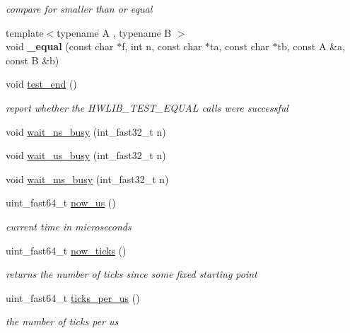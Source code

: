 \begin{DoxyCompactItemize}
\begin{DoxyCompactList}\small\item\em compare for smaller than or equal \end{DoxyCompactList}\item 
\mbox{\label{namespacehwlib_a967170cbb46d2043a348573f9f6d1459}} 
{\footnotesize template$<$typename A , typename B $>$ }\\void {\bfseries \+\_\+equal} (const char $\ast$f, int n, const char $\ast$ta, const char $\ast$tb, const A \&a, const B \&b)
\item 
void \hyperlink{namespacehwlib_af30c15244b6a508f320f01317dc84d7f}{test\+\_\+end} ()
\begin{DoxyCompactList}\small\item\em report whether the H\+W\+L\+I\+B\+\_\+\+T\+E\+S\+T\+\_\+\+E\+Q\+U\+AL calls were successful \end{DoxyCompactList}\item 
void \hyperlink{namespacehwlib_a7f8f4b0176df290091ac1d2cbaede23b}{wait\+\_\+ns\+\_\+busy} (int\+\_\+fast32\+\_\+t n)
\item 
void \hyperlink{namespacehwlib_a9ebdd2f578adeea0543e9c99778e2459}{wait\+\_\+us\+\_\+busy} (int\+\_\+fast32\+\_\+t n)
\item 
void \hyperlink{namespacehwlib_a15a3f36ce8b3f31473cdd8026b7e5960}{wait\+\_\+ms\+\_\+busy} (int\+\_\+fast32\+\_\+t n)
\item 
uint\+\_\+fast64\+\_\+t \hyperlink{namespacehwlib_a27573ff04679de98f9325a8d9cff7a14}{now\+\_\+us} ()
\begin{DoxyCompactList}\small\item\em current time in microseconds \end{DoxyCompactList}\item 
uint\+\_\+fast64\+\_\+t \hyperlink{namespacehwlib_a004512830e68d72d8fd0e3153895e65b}{now\+\_\+ticks} ()
\begin{DoxyCompactList}\small\item\em returns the number of ticks since some fixed starting point \end{DoxyCompactList}\item 
uint\+\_\+fast64\+\_\+t \hyperlink{namespacehwlib_a0d513bcd3062ebfea65bcb2c82e0c1a8}{ticks\+\_\+per\+\_\+us} ()
\begin{DoxyCompactList}\small\item\em the number of ticks per us \end{DoxyCompactList}\item 

\end{DoxyCompactItemize}
